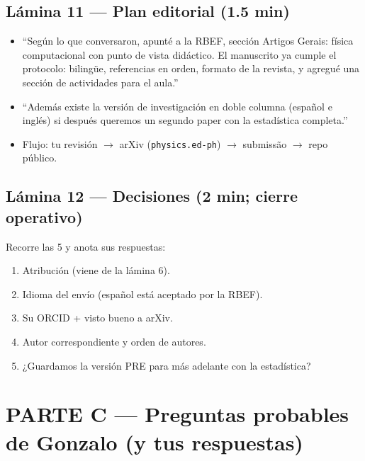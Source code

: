 \documentclass[11pt,a4paper]{article}
\begin{document}
\subsection*{Lámina 11 --- Plan editorial (1.5 min)}
\begin{itemize}[leftmargin=1.4em]
    \item ``Según lo que conversaron, apunté a la RBEF, sección Artigos
    Gerais: física computacional con punto de vista didáctico. El
    manuscrito ya cumple el protocolo: bilingüe, referencias en orden,
    formato de la revista, y agregué una sección de actividades para el
    aula.''
    \item ``Además existe la versión de investigación en doble columna
    (español e inglés) si después queremos un segundo paper con la
    estadística completa.''
    \item Flujo: tu revisión $\to$ arXiv (\texttt{physics.ed-ph}) $\to$
    submissão $\to$ repo público.
\end{itemize}

\subsection*{Lámina 12 --- Decisiones (2 min; cierre operativo)}
Recorre las 5 y anota sus respuestas:
\begin{enumerate}[leftmargin=1.6em]
    \item Atribución (viene de la lámina 6).
    \item Idioma del envío (español está aceptado por la RBEF).
    \item Su ORCID + visto bueno a arXiv.
    \item Autor correspondiente y orden de autores.
    \item ¿Guardamos la versión PRE para más adelante con la estadística?
\end{enumerate}

\section{PARTE C --- Preguntas probables de Gonzalo (y tus respuestas)}
\end{document}
